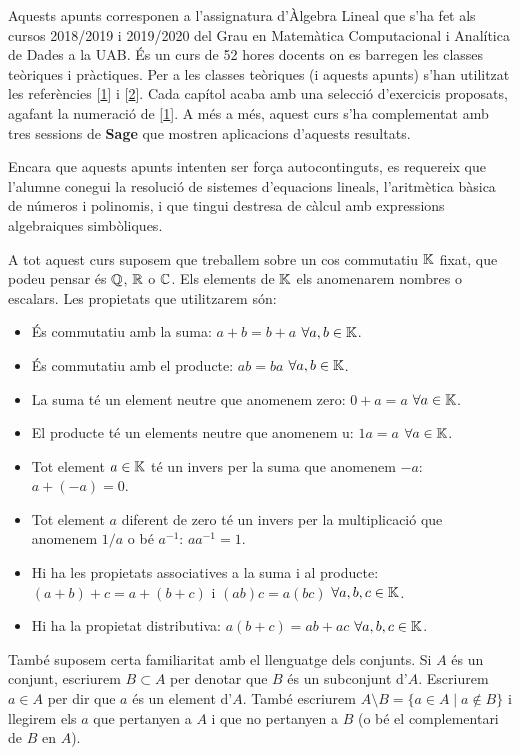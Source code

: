 \documentclass[
  11pt,
]{book}
\numberwithin{dummy}{section}
\theoremstyle{maincolornumbox}
\theoremstyle{blacknumex}
\theoremstyle{blacknumbox}
\theoremstyle{maincolornum}
\newlength\esp
\begin{document}
Aquests apunts corresponen a l'assignatura d'Àlgebra Lineal que s'ha fet
als cursos 2018/2019 i 2019/2020 del Grau en Matemàtica Computacional i
Analítica de Dades a la UAB. És un curs de 52 hores docents on es
barregen les classes teòriques i pràctiques. Per a les classes teòriques
(i aquests apunts) s'han utilitzat les referències {[}\protect\hyperlink{ref-Bret}{1}{]} i {[}\protect\hyperlink{ref-NaXa}{2}{]}.
Cada capítol acaba amb una selecció d'exercicis proposats, agafant la
numeració de {[}\protect\hyperlink{ref-Bret}{1}{]}. A més a més, aquest curs s'ha complementat amb
tres sessions de \textbf{Sage} que mostren aplicacions d'aquests resultats.

Encara que aquests apunts intenten ser força autocontinguts, es
requereix que l'alumne conegui la resolució de sistemes d'equacions
lineals, l'aritmètica bàsica de números i polinomis, i que tingui
destresa de càlcul amb expressions algebraiques simbòliques.

A tot aquest curs suposem que treballem sobre un cos commutatiu \(\mathbb{K}\)
fixat, que podeu pensar és \(\mathbb{Q}\), \(\mathbb{R}\) o \(\mathbb{C}\). Els elements de \(\mathbb{K}\) els
anomenarem nombres o escalars. Les propietats que utilitzarem són:

\begin{itemize}
\item
  És commutatiu amb la suma: \(a+b=b+a\) \(\forall a,b\in \mathbb{K}\).
\item
  És commutatiu amb el producte: \(ab=ba\) \(\forall a,b\in \mathbb{K}\).
\item
  La suma té un element neutre que anomenem zero: \(0+a=a\)
  \(\forall a\in\mathbb{K}\).
\item
  El producte té un elements neutre que anomenem u: \(1a=a\)
  \(\forall a\in\mathbb{K}\).
\item
  Tot element \(a\in\mathbb{K}\) té un invers per la suma que anomenem \(-a\):
  \(a+(-a)=0\).
\item
  Tot element \(a\) diferent de zero té un invers per la multiplicació
  que anomenem \(1/a\) o bé \(a^{-1}\): \(a a^{-1}=1\).
\item
  Hi ha les propietats associatives a la suma i al producte:
  \((a+b)+c=a+(b+c)\) i \((ab)c=a(bc)\) \(\forall a,b,c \in \mathbb{K}\).
\item
  Hi ha la propietat distributiva: \(a(b+c)=ab+ac\)
  \(\forall a,b,c \in \mathbb{K}\).
\end{itemize}

També suposem certa familiaritat amb el llenguatge dels conjunts. Si \(A\)
és un conjunt, escriurem \(B\subset A\) per denotar que \(B\) és un
subconjunt d'\(A\). Escriurem \(a\in A\) per dir que \(a\) és un element
d'\(A\). També escriurem \(A\setminus B=\{a \in A \mid a \not\in B\}\) i
llegirem els \(a\) que pertanyen a \(A\) i que no pertanyen a \(B\) (o bé el
complementari de \(B\) en \(A\)).
\end{document}

